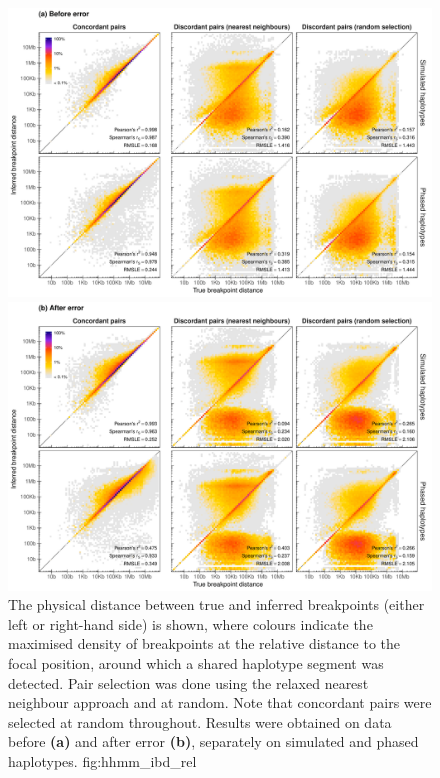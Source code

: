 

\begin{figure}[p]
\vspace*{-5pt}
\includegraphics[width=\textwidth]{./img/ch5/hhmm_ibd_rel_A}
\includegraphics[width=\textwidth]{./img/ch5/hhmm_ibd_rel_B}
{The physical distance between true and inferred breakpoints (either left or right-hand side) is shown, where colours indicate the maximised density of breakpoints at the relative distance to the focal position, around which a shared haplotype segment was detected.
Pair selection was done using the relaxed nearest neighbour approach and at random.
Note that concordant pairs were selected at random throughout.
Results were obtained on data before \textbf{(a)} and after error \textbf{(b)}, separately on simulated and phased haplotypes.}
{fig:hhmm_ibd_rel}
\end{figure}
